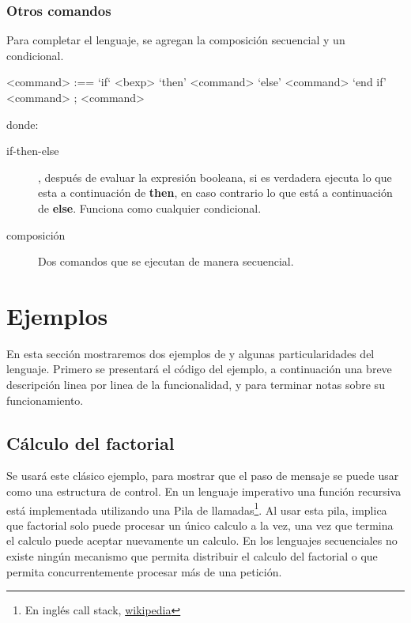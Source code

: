 \subsubsection*{Otros comandos}

Para completar el lenguaje, se agregan la composición secuencial y un condicional.

\begin{grammar}
  <command> :== `if` <bexp> `then' <command> `else' <command> `end if'
  \alt <command> ; <command>
\end{grammar}

donde:

\begin{description}
\item [if-then-else], después de evaluar la expresión booleana, si es verdadera
  ejecuta lo que esta a continuación de \textbf{then}, en caso contrario lo que está a
  continuación de \textbf{else}. Funciona como cualquier condicional.
\item [composición] Dos comandos que se ejecutan de manera secuencial.

\end{description}

\section{Ejemplos}

En esta sección mostraremos dos ejemplos de \SAL y algunas particularidades del lenguaje. Primero se presentará el código del ejemplo, a continuación una breve descripción linea por linea de la funcionalidad, y para terminar notas sobre su funcionamiento.

\subsection{Cálculo del factorial}\label{sal:factorial}

Se usará este clásico ejemplo, para mostrar que el paso de mensaje se puede usar como una estructura de control. En un lenguaje imperativo una función recursiva está implementada utilizando una Pila de llamadas\footnote{En inglés call stack, \href{https://es.wikipedia.org/wiki/Pila_de_llamadas}{wikipedia}}. Al usar esta pila, implica que factorial solo puede procesar un único calculo a la vez, una vez que termina el calculo puede aceptar nuevamente un calculo. En los lenguajes secuenciales no existe ningún mecanismo que permita distribuir el calculo del factorial o que permita concurrentemente procesar más de una petición.

